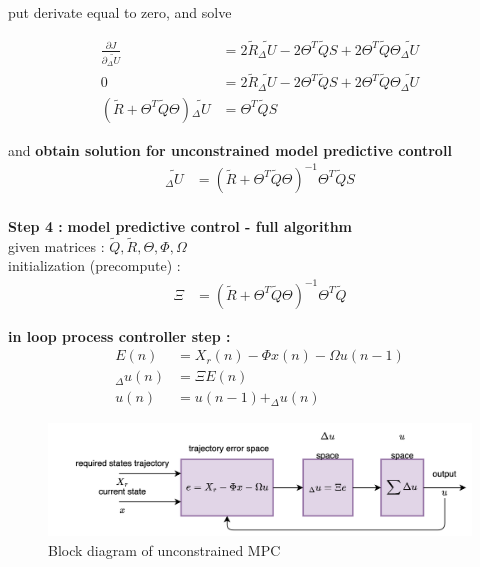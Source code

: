 \documentclass[12pt,twoside,onecolumn,openany,extrafontsizes,dvipsnames]{memoir}
\begin{document}
        put derivate equal to zero, and solve

        \begin{align}
            \frac{\partial J}{\partial {\tilde{_\Delta U}}} & = 2 \tilde{R} \tilde{_\Delta U} - 2\Theta^T\tilde{Q}S + 2\Theta^T\tilde{Q}\Theta\tilde{_\Delta U} \\
            0 &= 2 \tilde{R} \tilde{_\Delta U} - 2\Theta^T\tilde{Q}S + 2\Theta^T\tilde{Q}\Theta\tilde{_\Delta U} \nonumber \\
            (\tilde{R} + \Theta^T\tilde{Q}\Theta)\tilde{_\Delta U}  &= \Theta^T\tilde{Q}S \nonumber 
            \label{eq:mpc_zero_solving} 
        \end{align}  
      
        and \textbf{obtain solution for unconstrained model predictive controll}
        \begin{align}
            \tilde{_\Delta U} &= (\tilde{R} + \Theta^T\tilde{Q}\Theta)^{-1} \Theta^T\tilde{Q}S \\
            \label{eq:mpc_solution} 
        \end{align}     

        \textbf{Step 4 : } \textbf{model predictive control - full algorithm} \\
        given matrices : $\tilde{Q}, \tilde{R}, \Theta, \Phi, \Omega$ \\
        initialization (precompute) :
        \begin{align}
            \Xi &= (\tilde{R} + \Theta^T\tilde{Q}\Theta)^{-1} \Theta^T\tilde{Q}
            \label{eq:mpc_fast_solution_1}
        \end{align}
        
        \textbf{in loop process controller step :}
        \begin{align}
            E(n) &= X_r(n) - \Phi x(n) - \Omega u(n-1) \\
            _\Delta u(n) &= \Xi E(n) \nonumber \\
            u(n) &= u(n-1) + _\Delta u(n) \nonumber
            \label{eq:mpc_fast_solution_2}
        \end{align}
        
        \begin{figure}[!htb]
            \centering
            \includegraphics[scale=0.8]{../diagrams/control/control-mpc.png}
            \caption{Block diagram of unconstrained MPC}
            \label{fig:mpc_block}
        \end{figure}
\end{document}
